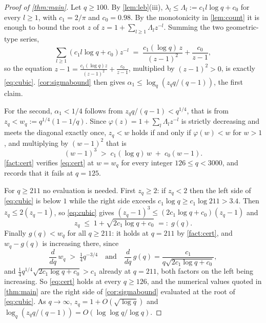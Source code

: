 \documentclass[11pt]{amsart}
\theoremstyle{definition}
\theoremstyle{remark}
\begin{document}
\begin{proof}[Proof of \cref{thm:main}]
Let $q \ge 100$. By \cref{lem:leb}(iii), $\lambda_{l} \le \Lambda_{l} := c_{1}l\log q + c_{0}$ for every $l \ge 1$, with $c_{1} = 2/\pi$ and $c_{0} = 0.98$. By the monotonicity in \cref{lem:count} it is enough to bound the root $z$ of $z = 1 + \sum_{l\ge1}\Lambda_{l}z^{-l}$. Summing the two geometric-type series,
\[
  \sum_{l \ge 1}\left(c_{1}l\log q + c_{0}\right)z^{-l} \;=\; \frac{c_{1}(\log q)\,z}{(z-1)^{2}} + \frac{c_{0}}{z-1},
\]
so the equation $z - 1 = \frac{c_{1}(\log q)z}{(z-1)^{2}} + \frac{c_{0}}{z-1}$, multiplied by $(z-1)^{2} > 0$, is exactly \cref{eq:cubic}. \cref{cor:sigmabound} then gives $\alpha_{1} \le \log_{q}(z_{q}q/(q-1))$, the first claim.

For the second, $\alpha_{1} < 1/4$ follows from $z_{q}q/(q-1) < q^{1/4}$, that is from $z_{q} < w_{q} := q^{1/4}(1-1/q)$. Since $\varphi(z) = 1 + \sum_{l}\Lambda_{l}z^{-l}$ is strictly decreasing and meets the diagonal exactly once, $z_{q} < w$ holds if and only if $\varphi(w) < w$ for $w > 1$, and multiplying by $(w-1)^{2}$ that is
\begin{equation}
\label{eq:cert}
  (w-1)^{3} \;>\; c_{1}(\log q)\,w \;+\; c_{0}(w-1).
\end{equation}
\cref{fact:cert} verifies \cref{eq:cert} at $w = w_{q}$ for every integer $126 \le q < 3000$, and records that it fails at $q = 125$.

For $q \ge 211$ no evaluation is needed. First $z_{q} \ge 2$: if $z_{q} < 2$ then the left side of \cref{eq:cubic} is below $1$ while the right side exceeds $c_{1}\log q \ge c_{1}\log 211 > 3.4$. Then $z_{q} \le 2(z_{q}-1)$, so \cref{eq:cubic} gives $(z_{q}-1)^{3} \le \left(2c_{1}\log q + c_{0}\right)(z_{q}-1)$ and
\[
  z_{q} \;\le\; 1 + \sqrt{2c_{1}\log q + c_{0}} \;=:\; g(q).
\]
Finally $g(q) < w_{q}$ for all $q \ge 211$: it holds at $q = 211$ by \cref{fact:cert}, and $w_{q} - g(q)$ is increasing there, since
\[
  \frac{d}{dq}\,w_{q} \;>\; \tfrac14 q^{-3/4} \quad\text{and}\quad \frac{d}{dq}\,g(q) = \frac{c_{1}}{q\sqrt{2c_{1}\log q + c_{0}}},
\]
and $\frac14 q^{1/4}\sqrt{2c_{1}\log q + c_{0}} > c_{1}$ already at $q = 211$, both factors on the left being increasing. So \cref{eq:cert} holds at every $q \ge 126$, and the numerical values quoted in \cref{thm:main} are the right side of \cref{cor:sigmabound} evaluated at the root of \cref{eq:cubic}. As $q \to \infty$, $z_{q} = 1 + O(\sqrt{\log q})$ and $\log_{q}(z_{q}q/(q-1)) = O(\log\log q/\log q)$.
\end{proof}
\end{document}
